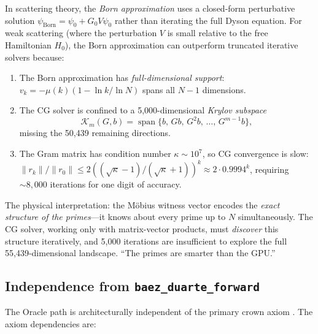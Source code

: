 \begin{correspondence}
\label{corr:krylov}
In scattering theory, the \emph{Born approximation} uses a closed-form
perturbative solution $\psi_{\text{Born}} = \psi_0 + G_0 V \psi_0$
rather than iterating the full Dyson equation. For weak scattering
(where the perturbation $V$ is small relative to the free Hamiltonian
$H_0$), the Born approximation can outperform truncated iterative
solvers because:

\begin{enumerate}
  \item The Born approximation has \emph{full-dimensional support}:
    $v_k = -\mu(k)(1 - \ln k / \ln N)$ spans all $N-1$ dimensions.
  \item The CG solver is confined to a 5{,}000-dimensional
    \emph{Krylov subspace}
    \[
      \mathcal{K}_m(G, b) =
      \operatorname{span}\{b,\, Gb,\, G^2 b,\, \ldots,\, G^{m-1} b\},
    \]
    missing the 50{,}439 remaining directions.
  \item The Gram matrix has condition number $\kappa \sim 10^7$,
    so CG convergence is slow: $\|r_k\|/\|r_0\| \leq
    2((\sqrt{\kappa}-1)/(\sqrt{\kappa}+1))^k \approx 2 \cdot 0.9994^k$,
    requiring $\sim 8{,}000$ iterations for one digit of accuracy.
\end{enumerate}

The physical interpretation: the Möbius witness vector encodes the
\emph{exact structure of the primes}---it knows about every prime up
to $N$ simultaneously. The CG solver, working only with matrix-vector
products, must \emph{discover} this structure iteratively, and 5{,}000
iterations are insufficient to explore the full 55{,}439-dimensional
landscape. ``The primes are smarter than the GPU.''
\end{correspondence}

\subsection{Independence from \texttt{baez\_duarte\_forward}}

The Oracle path is architecturally independent of the primary crown
axiom . The axiom dependencies are:


